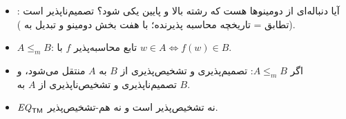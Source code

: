 \begin{summary}
\begin{itemize}
\item {}: آیا دنباله‌ای از دومینوها هست که رشته بالا و پایین یکی شود؟ تصمیم‌ناپذیر است (تطابق = تاریخچه محاسبه پذیرنده؛ با هفت بخش دومینو و تبدیل  به ).
\item $A\le_m B$: تابع محاسبه‌پذیر $f$ با $w\in A\iff f(w)\in B$.
\item اگر $A\le_m B$: تصمیم‌پذیری و تشخیص‌پذیری از $B$ به $A$ منتقل می‌شود، و تصمیم‌ناپذیری و تشخیص‌ناپذیری از $A$ به $B$.
\item $\mathit{EQ}_{\mathsf{TM}}$ نه تشخیص‌پذیر است و نه هم-تشخیص‌پذیر.
\end{itemize}
\end{summary}
